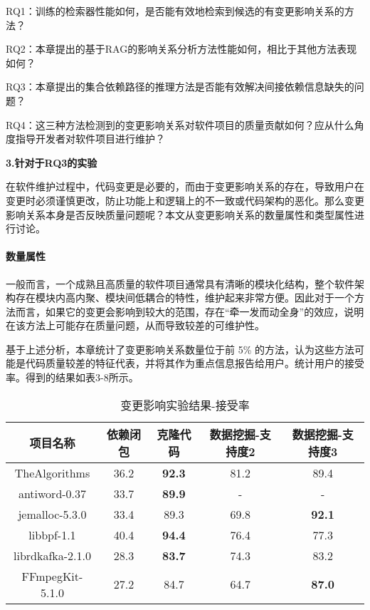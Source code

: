 RQ1：训练的检索器性能如何，是否能有效地检索到候选的有变更影响关系的方法？

RQ2：本章提出的基于RAG的影响关系分析方法性能如何，相比于其他方法表现如何？

RQ3：本章提出的集合依赖路径的推理方法是否能有效解决间接依赖信息缺失的问题？

RQ4：这三种方法检测到的变更影响关系对软件项目的质量贡献如何？应从什么角度指导开发者对软件项目进行维护？


\textbf{3.针对于RQ3的实验}



在软件维护过程中，代码变更是必要的，而由于变更影响关系的存在，导致用户在变更时必须谨慎更改，防止功能上和逻辑上的不一致或代码架构的恶化。那么变更影响关系本身是否反映质量问题呢？本文从变更影响关系的数量属性和类型属性进行讨论。

\paragraph{数量属性} 一般而言，一个成熟且高质量的软件项目通常具有清晰的模块化结构，整个软件架构存在模块内高内聚、模块间低耦合的特性，维护起来非常方便。因此对于一个方法而言，如果它的变更会影响到较大的范围，存在“牵一发而动全身”的效应，说明在该方法上可能存在质量问题，从而导致较差的可维护性。

基于上述分析，本章统计了变更影响关系数量位于前 5\% 的方法，认为这些方法可能是代码质量较差的特征代表，并将其作为重点信息报告给用户。统计用户的接受率。得到的结果如表3-8所示。

\begin{table}[htbp]
\caption{变更影响实验结果-接受率}
\vspace{0.5em}\centering\wuhao
\begin{tabular}{ccccc}
\toprule
项目名称 & 依赖闭包 & 克隆代码 & 数据挖掘-支持度2 & 数据挖掘-支持度3 \\
\midrule
TheAlgorithms & 36.2 & \textbf{92.3} & 81.2 & 89.4\\
antiword-0.37 & 33.7 & \textbf{89.9} & - & -\\
jemalloc-5.3.0 & 33.4 & 89.3 & 69.8 & \textbf{92.1}\\
libbpf-1.1 & 40.4 & \textbf{94.4} & 76.4 & 77.3\\
librdkafka-2.1.0 & 28.3 & \textbf{83.7} & 74.3 & 83.2\\
FFmpegKit-5.1.0 & 27.2 & 84.7 & 64.7 & \textbf{87.0}\\

\bottomrule
\end{tabular}
\end{table}

